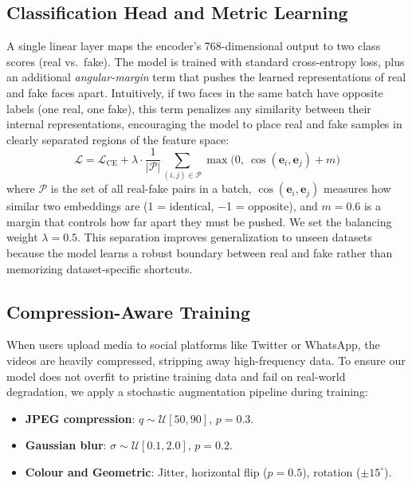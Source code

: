 \documentclass[conference]{IEEEtran}
\begin{document}
\subsection{Classification Head and Metric Learning}
A single linear layer maps the encoder's 768-dimensional output to two class scores (real vs.\ fake). The model is trained with standard cross-entropy loss, plus an additional \emph{angular-margin} term that pushes the learned representations of real and fake faces apart. Intuitively, if two faces in the same batch have opposite labels (one real, one fake), this term penalizes any similarity between their internal representations, encouraging the model to place real and fake samples in clearly separated regions of the feature space:
\begin{equation} \label{eq:combined}
    \mathcal{L} = \mathcal{L}_{\text{CE}} + \lambda \cdot \frac{1}{|\mathcal{P}|}\sum_{(i,j)\in\mathcal{P}}\max\big(0,\ \cos(\mathbf{e}_i, \mathbf{e}_j) + m\big)
\end{equation}
where $\mathcal{P}$ is the set of all real-fake pairs in a batch, $\cos(\mathbf{e}_i, \mathbf{e}_j)$ measures how similar two embeddings are (1 = identical, $-$1 = opposite), and $m = 0.6$ is a margin that controls how far apart they must be pushed. We set the balancing weight $\lambda = 0.5$. This separation improves generalization to unseen datasets because the model learns a robust boundary between real and fake rather than memorizing dataset-specific shortcuts.

\subsection{Compression-Aware Training}
When users upload media to social platforms like Twitter or WhatsApp, the videos are heavily compressed, stripping away high-frequency data. To ensure our model does not overfit to pristine training data and fail on real-world degradation, we apply a stochastic augmentation pipeline during training:
\begin{itemize}[leftmargin=*]
    \item \textbf{JPEG compression}: $q \sim \mathcal{U}[50, 90]$, $p = 0.3$.
    \item \textbf{Gaussian blur}: $\sigma \sim \mathcal{U}[0.1, 2.0]$, $p = 0.2$.
    \item \textbf{Colour and Geometric}: Jitter, horizontal flip ($p=0.5$), rotation ($\pm 15^\circ$).
\end{itemize}
\end{document}
